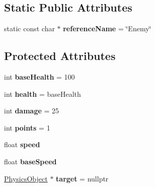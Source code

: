 \subsection*{Static Public Attributes}
\begin{DoxyCompactItemize}
\item 
\hypertarget{class_arena_1_1_enemy_a6d24e2b081471cdf2f98b2be7efa4f69}{static const char $\ast$ {\bfseries reference\+Name} = \char`\"{}Enemy\char`\"{}}\label{class_arena_1_1_enemy_a6d24e2b081471cdf2f98b2be7efa4f69}

\end{DoxyCompactItemize}
\subsection*{Protected Attributes}
\begin{DoxyCompactItemize}
\item 
\hypertarget{class_arena_1_1_enemy_ab0f3119116ee38319721e6a6114458a0}{int {\bfseries base\+Health} = 100}\label{class_arena_1_1_enemy_ab0f3119116ee38319721e6a6114458a0}

\item 
\hypertarget{class_arena_1_1_enemy_a8ff525eedd897bbb220f0d5787376276}{int {\bfseries health} = base\+Health}\label{class_arena_1_1_enemy_a8ff525eedd897bbb220f0d5787376276}

\item 
\hypertarget{class_arena_1_1_enemy_abf5959a001f72ecf6b8d3a5733b1e56a}{int {\bfseries damage} = 25}\label{class_arena_1_1_enemy_abf5959a001f72ecf6b8d3a5733b1e56a}

\item 
\hypertarget{class_arena_1_1_enemy_a6f189374e39470f3a56162f9d143da55}{int {\bfseries points} = 1}\label{class_arena_1_1_enemy_a6f189374e39470f3a56162f9d143da55}

\item 
\hypertarget{class_arena_1_1_enemy_a840f94d89e2b22427d13e2174214f7f8}{float {\bfseries speed}}\label{class_arena_1_1_enemy_a840f94d89e2b22427d13e2174214f7f8}

\item 
\hypertarget{class_arena_1_1_enemy_af962d0cb87f847a3694651dd587b9856}{float {\bfseries base\+Speed}}\label{class_arena_1_1_enemy_af962d0cb87f847a3694651dd587b9856}

\item 
\hypertarget{class_arena_1_1_enemy_a8b03a36b7f0ad192043c0a59338923dc}{\hyperlink{class_arena_1_1_physics_object}{Physics\+Object} $\ast$ {\bfseries target} = nullptr}\label{class_arena_1_1_enemy_a8b03a36b7f0ad192043c0a59338923dc}


\end{DoxyCompactItemize}

